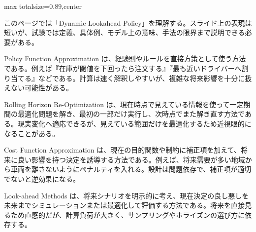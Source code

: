 \begin{minipage}[t]{0.58\textwidth}
\begin{adjustbox}{max totalsize={\textwidth}{0.89\textheight},center}
\begin{minipage}{\textwidth}\scriptsize
{}このページでは「Dynamic Lookahead Policy」を理解する。スライド上の表現は短いが、試験では定義、具体例、モデル上の意味、手法の限界まで説明できる必要がある。\par
Policy Function Approximation は、経験則やルールを直接方策として使う方法である。例えば『在庫が閾値を下回ったら注文する』『最も近いドライバーへ割り当てる』などである。計算は速く解釈しやすいが、複雑な将来影響を十分に扱えない可能性がある。\par
Rolling Horizon Re-Optimization は、現在時点で見えている情報を使って一定期間の最適化問題を解き、最初の一部だけ実行し、次時点でまた解き直す方法である。現実変化へ適応できるが、見えている範囲だけを最適化するため近視眼的になることがある。\par
Cost Function Approximation は、現在の目的関数や制約に補正項を加えて、将来に良い影響を持つ決定を誘導する方法である。例えば、将来需要が多い地域から車両を離さないようにペナルティを入れる。設計は問題依存で、補正項が適切でないと逆効果になる。\par
Look-ahead Methods は、将来シナリオを明示的に考え、現在決定の良し悪しを未来までシミュレーションまたは最適化して評価する方法である。将来を直接見るため直感的だが、計算負荷が大きく、サンプリングやホライズンの選び方に依存する。\par

\end{minipage}
\end{adjustbox}
\end{minipage}
